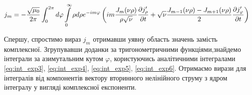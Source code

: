 %
%
%

\begin{equation*} \begin{aligned}
j_m = - \frac{\sqrt{\mu_0}}{2\pi} 
\int_{0}^{2\pi} d \varphi \int \limits_{0}^{\infty} \rho d \rho
e^{-im\varphi} \left( i  m \frac{J_m (\nu \rho)}{\rho \sqrt{\nu}}
\frac{\partial j_\rho^\prime}{\partial t} + \sqrt{\nu}
\frac{J_{m-1} (\nu \rho) - J_{m+1} (\nu \rho)}{2}
\frac{\partial j_\varphi^\prime}{\partial t} \right)
\end{aligned} \end{equation*}

Спершу, спростимо вираз $ j_m $ отримавши уявну область 
значень замість комплексної. Згрупувавши доданки за тригонометричними 
функціями,знайдемо інтеграли за азимутальним кутом $ \varphi $, 
користуючись аналітичними інтегралами \eqref{eq:int_exp3}, 
\eqref{eq:int_exp4}, \eqref{eq:int_exp5}, \eqref{eq:int_exp6}. Отримаємо 
вирази для інтегралів від компонентів вектору вторинного нелінійного струму 
з ядром інтегралу у вигляді комплексної експоненти.

